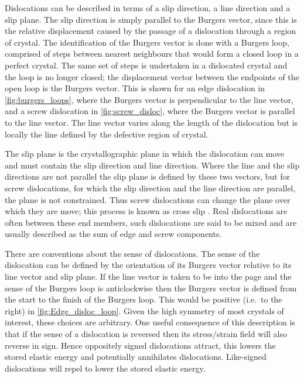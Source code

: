 Dislocations can be described in terms of a slip direction, a line direction and a slip plane. The slip direction is simply parallel to the Burgers vector, since this is the relative displacement caused by the passage of a dislocation through a region of crystal. The identification of the Burgers vector is done with a Burgers loop, comprised of steps between nearest neighbours that would form a closed loop in a perfect crystal. The same set of steps is undertaken in a dislocated crystal and the loop is no longer closed; the displacement vector between the endpoints of the open loop is the Burgers vector. This is shown for an edge dislocation in \autoref{fig:burgers_loops}, where the Burgers vector is perpendicular to the line vector, and a screw dislocation in \autoref{fig:screw_disloc}, where the Burgers vector is parallel to the line vector. The line vector varies along the length of the dislocation but is locally the line defined by the defective region of crystal. 

The slip plane is the crystallographic plane in which the dislocation can move and must contain the slip direction and line direction. Where the line and the slip directions are not parallel the slip plane is defined by these two vectors, but for screw dislocations, for which the slip direction and the line direction are parallel, the plane is not constrained. Thus screw dislocations can change the plane over which they are move; this process is known as cross slip \cite{Hirth_Lothe1982intro}. Real dislocations are often between these end members, such dislocations are said to be mixed and are usually described as the sum of edge and screw components.

There are conventions about the sense of dislocations. The sense of the dislocation can be defined by the orientation of its Burgers vector relative to its line vector and slip plane. If the line vector is taken to be into the page and the sense of the Burgers loop is anticlockwise then the Burgers vector is defined from the start to the finish of the Burgers loop. This would be positive (i.e.\ to the right) in \autoref{fig:Edge_disloc_loop}. Given the high symmetry of most crystals of interest, these choices are arbitrary. One useful consequence of this description is that if the sense of a dislocation is reversed then its stress/strain field will also reverse in sign. Hence oppositely signed dislocations attract, this lowers the stored elastic energy and potentially annihilates dislocations. Like-signed dislocations will repel to lower the  stored elastic energy.



